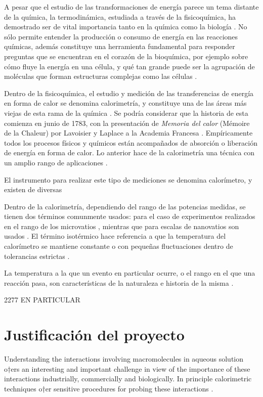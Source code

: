 	A pesar que el estudio de las transformaciones de energía parece un tema distante de la química, la termodinámica, estudiada a través de la fisicoquímica, ha demostrado ser de vital importancia tanto en la química como la biología \cite{atkins2011physical}. No sólo permite entender la producción o consumo de energía en las reacciones químicas, además constituye una herramienta fundamental para responder preguntas que se encuentran en el corazón de la bioquímica, por ejemplo sobre cómo fluye la energía en una célula, y qué tan grande puede ser la agrupación de moléculas que forman estructuras complejas como las células \cite{atkins2011physical}.
	
	Dentro de la fisicoquímica, el estudio y medición de las transferencias de energía en forma de calor se denomina calorimetría, y constituye una de las áreas más viejas de esta rama de la química \cite{zielenkiewicz2006theory}. Se podría considerar que la historia de esta comienza en junio de 1783, con la presentación de \textit{Memoria del calor} (Mémoire de la Chaleur) por Lavoisier y Laplace a la Academia Francesa \cite{zielenkiewicz2006theory}. Empíricamente todos los procesos físicos y químicos están acompañados de absorción o liberación de energía en forma de calor. Lo anterior hace de la calorimetría una técnica con un amplio rango de aplicaciones \cite{wadso2001standards}.

	El instrumento para realizar este tipo de mediciones se denomina calorímetro, y existen de diversas


	Dentro de la calorimetría, dependiendo del rango de las potencias medidas, se tienen dos términos comunmente usados:  para el caso de experimentos realizados en el rango de los microvatios \cite{wadso2001standards, wadso2003new}, mientras que para escalas de nanovatios son usados  \cite{wadso2003new}. El término isotérmico hace referencia a que la temperatura del calorímetro se mantiene constante o con pequeñas fluctuaciones dentro de tolerancias estrictas \cite{wadso2001standards}.
	
	La temperatura a la que un evento en particular ocurre, o el rango en el que una reacción pasa, son características de la naturaleza e historia de la misma \cite{gaisford2016principles}.
	
	2277 EN PARTICULAR
	
	
\section{Justificación del proyecto}
	Understanding the interactions involving macromolecules in aqueous solution o†ers an interesting and important challenge in view of the importance of these interactions industrially, commercially and biologically. In principle calorimetric techniques o†er sensitive procedures for probing these interactions \cite{blandamer1998titration}.

